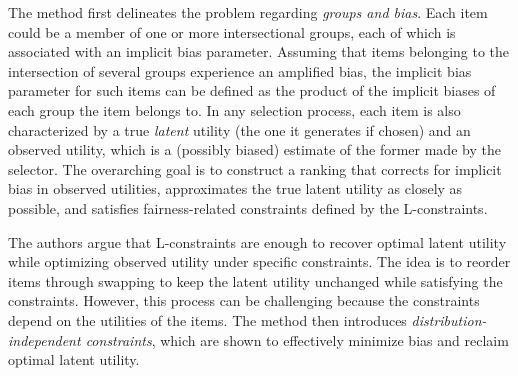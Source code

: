 The method first delineates the problem regarding \emph{groups and bias}.
Each item could be a member of one or more intersectional groups,
each of which
is associated with an implicit bias parameter.
Assuming that items belonging to the intersection of several groups experience an amplified bias, the implicit bias parameter for such items can be defined as the product of the implicit biases of each group the item belongs to.
In any selection process, each item is also characterized by a true \emph{latent} utility (the one it generates if chosen) and an observed utility, which is a (possibly biased) estimate of the former made by the selector.
The overarching goal is to construct a ranking that corrects for implicit bias in observed utilities, approximates the true latent utility as closely as possible, and satisfies fairness-related constraints defined by the L-constraints.

The authors argue that L-constraints are enough to recover optimal latent utility while optimizing observed utility under specific constraints. The idea is to reorder items through swapping to keep the latent utility unchanged while satisfying the constraints. However, this process can be challenging because the constraints depend on the utilities of the items.
%
The method then introduces \emph{distribution-independent constraints},
which are shown to
effectively minimize bias and reclaim optimal latent utility.


